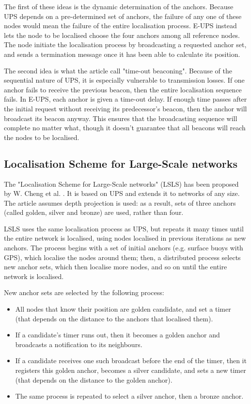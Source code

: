 \documentclass[12pt,a4paper,fleqn]{report}
\begin{document}
The first of these ideas is the dynamic determination of the anchors. Because UPS depends on a pre-determined set of anchors, the failure of any one of these nodes would mean the failure of the entire localisation process. E-UPS instead lets the node to be localised choose the four anchors among all reference nodes. The node initiate the localisation process by broadcasting a requested anchor set, and sends a termination message once it has been able to calculate its position.

The second idea is what the article call "time-out beaconing". Because of the sequential nature of UPS, it is especially vulnerable to transmission losses. If one anchor fails to receive the previous beacon, then the entire localisation sequence fails. In E-UPS, each anchor is given a time-out delay. If enough time passes after the initial request without receiving its predecessor's beacon, then the anchor will broadcast its beacon anyway. This ensures that the broadcasting sequence will complete no matter what, though it doesn't guarantee that all beacons will reach the nodes to be localised.

\subsection{Localisation Scheme for Large-Scale networks}

The "Localisation Scheme for Large-Scale networks" (LSLS) has been proposed by W. Cheng et al. \cite{lsls}. It is based on UPS and extends it to networks of any size. The article assumes depth projection is used: as a result, sets of three anchors (called golden, silver and bronze) are used, rather than four.

LSLS uses the same localisation process as UPS, but repeats it many times until the entire network is localised, using nodes localised in previous iterations as new anchors. The process begins with a set of initial anchors (e.g. surface buoys with GPS), which localise the nodes around them; then, a distributed process selects new anchor sets, which then localise more nodes, and so on until the entire network is localised.

New anchor sets are selected by the following process:

\begin{itemize}
	\itemsep0em
	\item All nodes that know their position are golden candidate, and set a timer (that depends on the distance to the anchors that localised them).
	\item If a candidate's timer runs out, then it becomes a golden anchor and broadcasts a notification to its neighbours.
	\item If a candidate receives one such broadcast before the end of the timer, then it registers this golden anchor, becomes a silver candidate, and sets a new timer (that depends on the distance to the golden anchor).
	\item The same process is repeated to select a silver anchor, then a bronze anchor.
\end{itemize}
\end{document}

